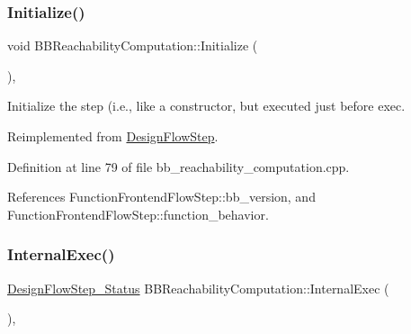 \mbox{\label{classBBReachabilityComputation_ad2e0ecc294538d9a60d9175d345fc11c}} 
\subsubsection{\texorpdfstring{Initialize()}{Initialize()}}
{\footnotesize\ttfamily void B\+B\+Reachability\+Computation\+::\+Initialize (\begin{DoxyParamCaption}{ }\end{DoxyParamCaption})\hspace{0.3cm}{\ttfamily [override]}, {\ttfamily [virtual]}}



Initialize the step (i.\+e., like a constructor, but executed just before exec. 



Reimplemented from \hyperlink{classDesignFlowStep_a44b50683382a094976e1d432a7784799}{Design\+Flow\+Step}.



Definition at line 79 of file bb\+\_\+reachability\+\_\+computation.\+cpp.



References Function\+Frontend\+Flow\+Step\+::bb\+\_\+version, and Function\+Frontend\+Flow\+Step\+::function\+\_\+behavior.

\mbox{\label{classBBReachabilityComputation_a9bfbe12285b834d001c922e29385a8c6}} 
\subsubsection{\texorpdfstring{Internal\+Exec()}{InternalExec()}}
{\footnotesize\ttfamily \hyperlink{design__flow__step_8hpp_afb1f0d73069c26076b8d31dbc8ebecdf}{Design\+Flow\+Step\+\_\+\+Status} B\+B\+Reachability\+Computation\+::\+Internal\+Exec (\begin{DoxyParamCaption}{ }\end{DoxyParamCaption})\hspace{0.3cm}{\ttfamily [override]}, {\ttfamily [virtual]}}



